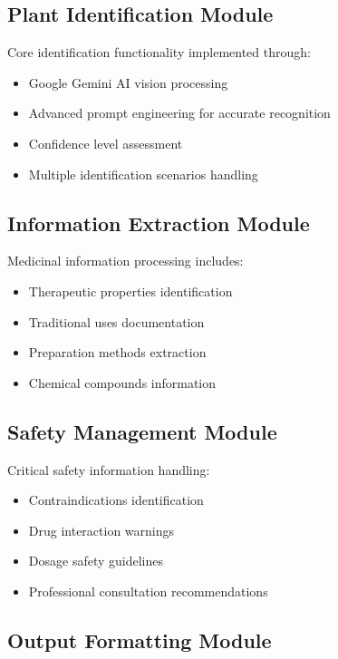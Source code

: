 \documentclass[conference]{IEEEtran}
\begin{document}
\subsection{Plant Identification Module}

Core identification functionality implemented through:

\begin{itemize}
\item Google Gemini AI vision processing
\item Advanced prompt engineering for accurate recognition
\item Confidence level assessment
\item Multiple identification scenarios handling
\end{itemize}

\subsection{Information Extraction Module}

Medicinal information processing includes:

\begin{itemize}
\item Therapeutic properties identification
\item Traditional uses documentation
\item Preparation methods extraction
\item Chemical compounds information
\end{itemize}

\subsection{Safety Management Module}

Critical safety information handling:

\begin{itemize}
\item Contraindications identification
\item Drug interaction warnings
\item Dosage safety guidelines
\item Professional consultation recommendations
\end{itemize}

\subsection{Output Formatting Module}
\end{document}
